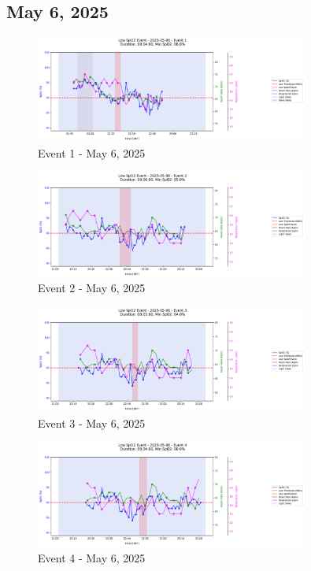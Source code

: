 \documentclass{article}
\begin{document}
\subsection{May 6, 2025}
\begin{figure}[htbp]
    \centering
    \includegraphics[width=0.8\textwidth]{images/2025-05-06_event_1.png}
    \caption{Event 1 - May 6, 2025}
\end{figure}
\begin{figure}[htbp]
    \centering
    \includegraphics[width=0.8\textwidth]{images/2025-05-06_event_2.png}
    \caption{Event 2 - May 6, 2025}
\end{figure}
\begin{figure}[htbp]
    \centering
    \includegraphics[width=0.8\textwidth]{images/2025-05-06_event_3.png}
    \caption{Event 3 - May 6, 2025}
\end{figure}
\begin{figure}[htbp]
    \centering
    \includegraphics[width=0.8\textwidth]{images/2025-05-06_event_4.png}
    \caption{Event 4 - May 6, 2025}
\end{figure}
\end{document}
